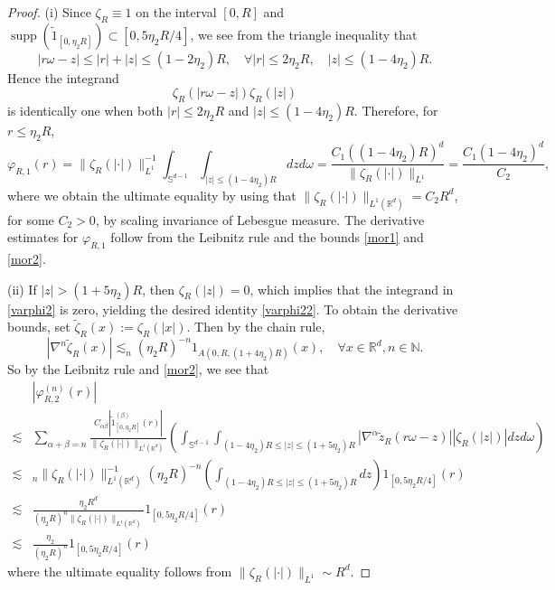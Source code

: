 \documentclass[reqno,11pt]{amsart}
\theoremstyle{plain}
\theoremstyle{definition}
\numberwithin{equation}{section}
\numberwithin{theorem}{section}
\def\leq{\leqslant}
\begin{document}
\begin{proof}

(i) Since $\zeta_{R} \equiv 1$ on the interval $[0, R]$ and $\operatorname{supp}\left(\tilde{1}_{[0, \eta_{2} R]}\right) \subset[0,5 \eta_{2} R / 4]$, we see from the triangle inequality that
\begin{equation*}
|r \omega-z| \leq|r|+|z| \leq(1-2 \eta_{2}) R, \quad \forall|r| \leq 2 \eta_{2} R, \quad|z| \leq (1-4 \eta_{2}) R.
\end{equation*}
Hence the integrand
\begin{equation*}
\zeta_{R}(|r \omega-z|) \zeta_{R}(|z|) 
\end{equation*}
is identically one when both $|r| \leq 2 \eta_{2} R$ and $|z| \leq(1-4 \eta_{2}) R$. Therefore, for $r\leq\eta_2R$,
\begin{equation*}
\varphi_{R, 1}(r)=\|\zeta_{R}(|\cdot|)\|_{L^{1}}^{-1} \int_{\mathbb{S}^{d-1}} \int_{|z| \leq(1-4 \eta_{2}) R} d z d \omega=\frac{C_{1}((1-4 \eta_{2}) R)^{d}}{\|\zeta_{R}(|\cdot|)\|_{L^{1}}}=\frac{C_{1}(1-4 \eta_{2})^{d}}{C_{2}},
\end{equation*}
where we obtain the ultimate equality by using that $\|\zeta_{R}(|\cdot|)\|_{L^{1}(\mathbb{R}^{d})}=C_{2} R^{d}$, for some $C_{2}>0$, by scaling invariance of Lebesgue measure. The derivative estimates for $\varphi_{R, 1}$ follow from the Leibnitz rule and the bounds \eqref{mor1} and \eqref{mor2}.

(ii) If $|z|>(1+5 \eta_{2}) R$, then $\zeta_{R}(|z|)=0$, which implies that the integrand in \eqref{varphi2} is zero, yielding the desired identity \eqref{varphi22}. To obtain the derivative bounds, set $\tilde{\zeta}_{R}(x):=\zeta_{R}(|x|)$. Then by the chain rule,
\[
|\nabla^{n} \tilde{\zeta}_{R}(x)| \lesssim_n(\eta_{2} R)^{-n} 1_{A(0, R,(1+4 \eta_{2}) R)}(x), \quad \forall x \in \mathbb{R}^{d}, n \in \mathbb{N}.
\]
So by the Leibnitz rule and \eqref{mor2}, we see that
\begin{align*}
&|\varphi_{R, 2}^{(n)}(r)| \\
\lesssim& \sum_{\alpha+\beta=n} \frac{C_{\alpha \beta}| \tilde{1}_{[0, \eta_{2} R]}^{(\beta)}(r)|}{\|\zeta_{R}(|\cdot|)\|_{L^{1}(\mathbb{R}^{d})}}\left(\int_{\mathbb{S}^{d-1}} \int_{(1-4 \eta_{2}) R \leq|z| \leq(1+5 \eta_{2}) R}|\nabla^{\alpha} \tilde{z}_{R}(r \omega-z)||\zeta_{R}(|z|)| d z d \omega\right) \\
 \lesssim&_n \|\zeta_{R}(|\cdot|)\|_{L^{1}(\mathbb{R}^{d})}^{-1}(\eta_{2} R)^{-n}\left(\int_{(1-4 \eta_{2}) R \leq|z| \leq(1+5 \eta_{2}) R} d z\right) 1_{[0,5 \eta_{2}R / 4]}(r) \\
 \lesssim& \frac{\eta_{2} R^{d}}{(\eta_{2} R)^{n}\|\zeta_{R}(|\cdot|)\|_{L^{1}(\mathbb{R}^{d})}} 1_{[0,5 \eta_{2}R / 4]}(r) \\
\lesssim& \frac{\eta_{2}}{(\eta_{2} R)^{n}} 1_{[0,5 \eta_{2}R / 4]}(r)
\end{align*}
where the ultimate equality follows from $\|\zeta_{R}(|\cdot|)\|_{L^{1}} \sim R^{d}$.


\end{proof}
\end{document}

